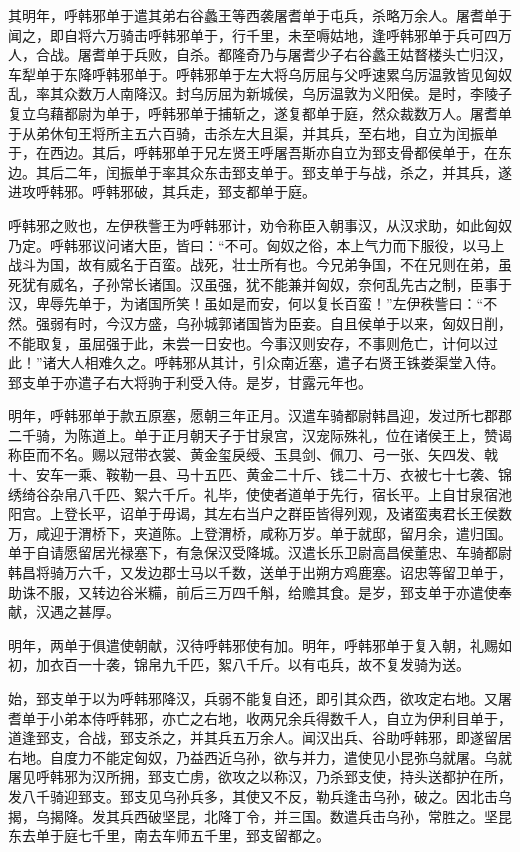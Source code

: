 \documentclass[12pt,UTF8]{ctexbook}
\begin{document}
其明年，呼韩邪单于遣其弟右谷蠡王等西袭屠耆单于屯兵，杀略万余人。屠耆单于闻之，即自将六万骑击呼韩邪单于，行千里，未至嗕姑地，逢呼韩邪单于兵可四万人，合战。屠耆单于兵败，自杀。都隆奇乃与屠耆少子右谷蠡王姑瞀楼头亡归汉，车犁单于东降呼韩邪单于。呼韩邪单于左大将乌厉屈与父呼速累乌厉温敦皆见匈奴乱，率其众数万人南降汉。封乌厉屈为新城侯，乌厉温敦为义阳侯。是时，李陵子复立乌藉都尉为单于，呼韩邪单于捕斩之，遂复都单于庭，然众裁数万人。屠耆单于从弟休旬王将所主五六百骑，击杀左大且渠，并其兵，至右地，自立为闰振单于，在西边。其后，呼韩邪单于兄左贤王呼屠吾斯亦自立为郅支骨都侯单于，在东边。其后二年，闰振单于率其众东击郅支单于。郅支单于与战，杀之，并其兵，遂进攻呼韩邪。呼韩邪破，其兵走，郅支都单于庭。



呼韩邪之败也，左伊秩訾王为呼韩邪计，劝令称臣入朝事汉，从汉求助，如此匈奴乃定。呼韩邪议问诸大臣，皆曰：“不可。匈奴之俗，本上气力而下服役，以马上战斗为国，故有威名于百蛮。战死，壮士所有也。今兄弟争国，不在兄则在弟，虽死犹有威名，子孙常长诸国。汉虽强，犹不能兼并匈奴，奈何乱先古之制，臣事于汉，卑辱先单于，为诸国所笑！虽如是而安，何以复长百蛮！”左伊秩訾曰：“不然。强弱有时，今汉方盛，乌孙城郭诸国皆为臣妾。自且侯单于以来，匈奴日削，不能取复，虽屈强于此，未尝一日安也。今事汉则安存，不事则危亡，计何以过此！”诸大人相难久之。呼韩邪从其计，引众南近塞，遣子右贤王铢娄渠堂入侍。郅支单于亦遣子右大将驹于利受入侍。是岁，甘露元年也。



明年，呼韩邪单于款五原塞，愿朝三年正月。汉遣车骑都尉韩昌迎，发过所七郡郡二千骑，为陈道上。单于正月朝天子于甘泉宫，汉宠际殊礼，位在诸侯王上，赞谒称臣而不名。赐以冠带衣裳、黄金玺戾绶、玉具剑、佩刀、弓一张、矢四发、戟十、安车一乘、鞍勒一县、马十五匹、黄金二十斤、钱二十万、衣被七十七袭、锦绣绮谷杂帛八千匹、絮六千斤。礼毕，使使者道单于先行，宿长平。上自甘泉宿池阳宫。上登长平，诏单于毋谒，其左右当户之群臣皆得列观，及诸蛮夷君长王侯数万，咸迎于渭桥下，夹道陈。上登渭桥，咸称万岁。单于就邸，留月余，遣归国。单于自请愿留居光禄塞下，有急保汉受降城。汉遣长乐卫尉高昌侯董忠、车骑都尉韩昌将骑万六千，又发边郡士马以千数，送单于出朔方鸡鹿塞。诏忠等留卫单于，助诛不服，又转边谷米糒，前后三万四千斛，给赡其食。是岁，郅支单于亦遣使奉献，汉遇之甚厚。



明年，两单于俱遣使朝献，汉待呼韩邪使有加。明年，呼韩邪单于复入朝，礼赐如初，加衣百一十袭，锦帛九千匹，絮八千斤。以有屯兵，故不复发骑为送。



始，郅支单于以为呼韩邪降汉，兵弱不能复自还，即引其众西，欲攻定右地。又屠耆单于小弟本侍呼韩邪，亦亡之右地，收两兄余兵得数千人，自立为伊利目单于，道逢郅支，合战，郅支杀之，并其兵五万余人。闻汉出兵、谷助呼韩邪，即遂留居右地。自度力不能定匈奴，乃益西近乌孙，欲与并力，遣使见小昆弥乌就屠。乌就屠见呼韩邪为汉所拥，郅支亡虏，欲攻之以称汉，乃杀郅支使，持头送都护在所，发八千骑迎郅支。郅支见乌孙兵多，其使又不反，勒兵逢击乌孙，破之。因北击乌揭，乌揭降。发其兵西破坚昆，北降丁令，并三国。数遣兵击乌孙，常胜之。坚昆东去单于庭七千里，南去车师五千里，郅支留都之。
\end{document}
